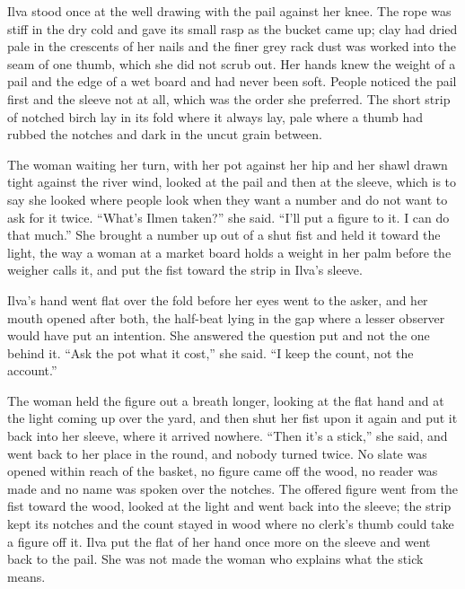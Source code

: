 Ilva stood once at the well drawing with the pail against her knee. The rope was stiff in the dry cold and gave its small rasp as the bucket came up; clay had dried pale in the crescents of her nails and the finer grey rack dust was worked into the seam of one thumb, which she did not scrub out. Her hands knew the weight of a pail and the edge of a wet board and had never been soft. People noticed the pail first and the sleeve not at all, which was the order she preferred. The short strip of notched birch lay in its fold where it always lay, pale where a thumb had rubbed the notches and dark in the uncut grain between.

The woman waiting her turn, with her pot against her hip and her shawl drawn tight against the river wind, looked at the pail and then at the sleeve, which is to say she looked where people look when they want a number and do not want to ask for it twice. “What's Ilmen taken?” she said. “I'll put a figure to it. I can do that much.” She brought a number up out of a shut fist and held it toward the light, the way a woman at a market board holds a weight in her palm before the weigher calls it, and put the fist toward the strip in Ilva's sleeve.

Ilva's hand went flat over the fold before her eyes went to the asker, and her mouth opened after both, the half-beat lying in the gap where a lesser observer would have put an intention. She answered the question put and not the one behind it. “Ask the pot what it cost,” she said. “I keep the count, not the account.”

The woman held the figure out a breath longer, looking at the flat hand and at the light coming up over the yard, and then shut her fist upon it again and put it back into her sleeve, where it arrived nowhere. “Then it's a stick,” she said, and went back to her place in the round, and nobody turned twice. No slate was opened within reach of the basket, no figure came off the wood, no reader was made and no name was spoken over the notches. The offered figure went from the fist toward the wood, looked at the light and went back into the sleeve; the strip kept its notches and the count stayed in wood where no clerk's thumb could take a figure off it. Ilva put the flat of her hand once more on the sleeve and went back to the pail. She was not made the woman who explains what the stick means.


